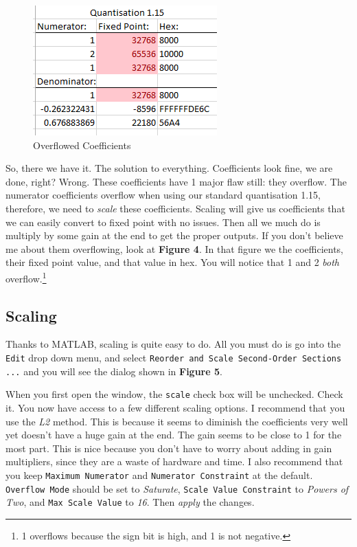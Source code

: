 \documentclass[12pt,a4paper,titlepage]{article}
\begin{document}
\begin{figure}[!htb]
  \centering
  \includegraphics[height=5cm]
                  {../presentation/overflow-coeffs.png}
                  \caption{Overflowed Coefficients}
\end{figure}

\newpage

So, there we have it. The solution to everything. Coefficients look fine, we are
done, right? Wrong. These coefficients have 1 major flaw still: they
overflow. The numerator coefficients overflow when using our standard
quantisation 1.15, therefore, we need to \emph{scale} these
coefficients. Scaling will give us coefficients that we can easily convert to
fixed point with no issues. Then all we much do is multiply by some gain at the
end to get the proper outputs. If you don't believe me about them overflowing,
look at \textbf{Figure 4}. In that figure we the coefficients, their fixed point
value, and that value in hex. You will notice that 1 and 2 \emph{both}
overflow.\footnote{1 overflows because the sign bit is high, and 1 is not
  negative.}

\subsection{Scaling}
Thanks to MATLAB, scaling is quite easy to do. All you must do is go into the
\texttt{Edit} drop down menu, and select \texttt{Reorder and Scale Second-Order
  Sections ...} and you will see the dialog shown in \textbf{Figure 5}.

When you first open the window, the \texttt{scale} check box will be
unchecked. Check it. You now have access to a few different scaling options. I
recommend that you use the \emph{L2} method. This is because it seems to
diminish the coefficients very well yet doesn't have a huge gain at the end. The
gain seems to be close to 1 for the most part. This is nice because you don't
have to worry about adding in gain multipliers, since they are a waste of
hardware and time. I also recommend that you keep \texttt{Maximum Numerator} and
\texttt{Numerator Constraint} at the default. \texttt{Overflow Mode} should be
set to \emph{Saturate}, \texttt{Scale Value Constraint} to \emph{Powers of Two},
and \texttt{Max Scale Value} to \emph{16}. Then \emph{apply} the changes.
\end{document}
